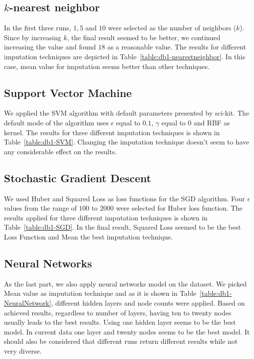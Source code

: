 \subsection{$k$-nearest neighbor}
In the first three runs, $1, 5$ and $10$ were selected as the number of neighbors ($k$). Since by increasing $k$, the final result seemed to be better, we continued increasing the value and found $18$ as a reasonable value. The results for different imputation techniques are depicted in Table~\ref{table:db1-nearestneighbor}. In this case, mean value for imputation seems better than other techniques.

\subsection{Support Vector Machine}
We applied the SVM algorithm with default parameters presented by sci-kit. The default mode of the algorithm uses $\epsilon$ equal to $0.1$, $\gamma$ equal to $0$ and RBF as kernel. The results for three different imputation techniques is shown in Table~\ref{table:db1-SVM}. Changing the imputation technique doesn't seem to have any considerable effect on the results.

\subsection{Stochastic Gradient Descent}
We used Huber and Squared Loss as loss functions for the SGD algorithm. Four $\epsilon$ values from the range of $100$ to $2000$ were selected for Huber loss function. The results applied for three different imputation techniques is shown in Table~\ref{table:db1-SGD}. In the final result, Squared Loss seemed to be the best Loss Function and Mean the best imputation technique.

\subsection{Neural Networks}
As the last part, we also apply neural networks model on the dataset. We picked Mean value as imputation technique and as it is shown in Table~\ref{table:db1-NeuralNetwork}, different hidden layers and node counts were applied. Based on achieved results, regardless to number of layers, having ten to twenty nodes usually leads to the best results. Using one hidden layer seems to be the best model. In current data one layer and twenty nodes seems to be the best model. It should also be considered that different runs return different results while not very diverse.

